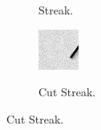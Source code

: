 \begin{figure}[!h]
\begin{subfigure}{.2\textwidth}
        \label{fig:fitsreal3b}
        \caption{Streak.}
    \end{subfigure}
    \begin{subfigure}{.2\textwidth}
        \centering
        \includegraphics[width=\textwidth]{images/cutline.png}
        \label{fig:fitsreal3c}
        \caption{Cut Streak.}
    \end{subfigure}
    
    \vspace*{4mm}
    

\end{figure}
